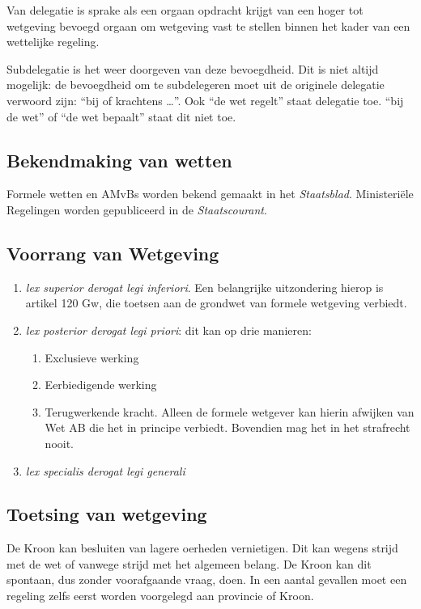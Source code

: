 \documentclass{article}
\begin{document}
Van delegatie is sprake als een orgaan opdracht krijgt van een hoger tot 
wetgeving bevoegd orgaan om wetgeving vast te stellen binnen het kader 
van een wettelijke regeling. 

Subdelegatie is het weer doorgeven van deze bevoegdheid. Dit is niet altijd mogelijk: 
de bevoegdheid om te subdelegeren moet uit de originele delegatie verwoord zijn: 
``bij of krachtens \ldots''. Ook ``de wet regelt'' staat delegatie toe. ``bij de wet''
of ``de wet bepaalt'' staat dit niet toe. 

\subsection{Bekendmaking van wetten}

Formele wetten en AMvBs worden bekend gemaakt in het \emph{Staatsblad}. Ministeriële 
Regelingen worden gepubliceerd in de \emph{Staatscourant}. 

\subsection{Voorrang van Wetgeving}

\begin{enumerate}
  \item \emph{lex superior derogat legi inferiori}. Een belangrijke uitzondering hierop 
    is artikel 120 Gw, die toetsen aan de grondwet van formele wetgeving verbiedt. 
  \item \emph{lex posterior derogat legi priori}: dit kan op drie manieren:
    \begin{enumerate}
      \item Exclusieve werking
      \item Eerbiedigende werking
      \item Terugwerkende kracht. Alleen de formele wetgever kan hierin afwijken van Wet AB
        die het in principe verbiedt. Bovendien mag het in het strafrecht nooit.
    \end{enumerate}
  \item \emph{lex specialis derogat legi generali}
\end{enumerate}

\subsection{Toetsing van wetgeving}

De Kroon kan besluiten van lagere oerheden vernietigen. Dit kan wegens strijd
met de wet of vanwege strijd met het algemeen belang. De Kroon kan dit
spontaan, dus zonder voorafgaande vraag, doen. In een aantal gevallen moet een
regeling zelfs eerst worden voorgelegd aan provincie of Kroon.
\end{document}
